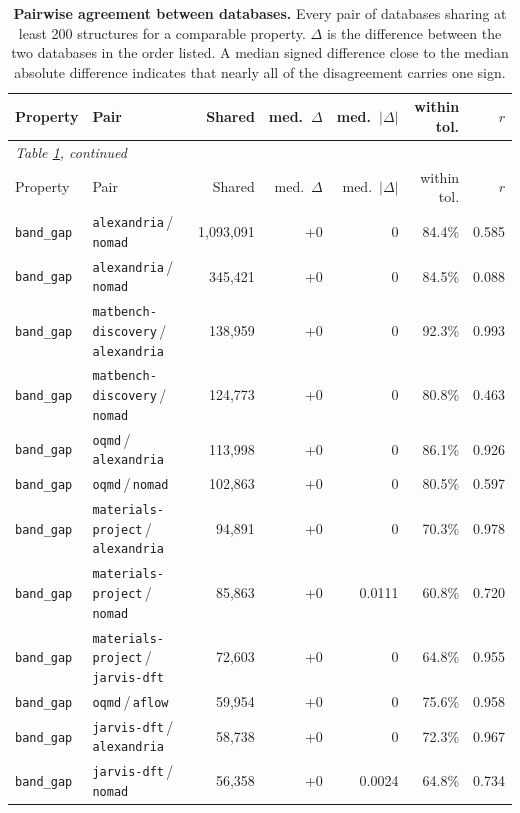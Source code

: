 \begin{longtable}{llrrrrr}
\caption{\textbf{Pairwise agreement between databases.} Every pair of databases sharing at least 200 structures for a comparable property. $\Delta$ is the difference between the two databases in the order listed. A median signed difference close to the median absolute difference indicates that nearly all of the disagreement carries one sign.}\label{tab:pairs}\\
\toprule
Property & Pair & Shared & med.\ $\Delta$ & med.\ $|\Delta|$ & within tol. & $r$ \\ \midrule \endfirsthead
\multicolumn{7}{l}{\footnotesize\itshape Table \ref{tab:pairs}, continued}\\ \toprule
Property & Pair & Shared & med.\ $\Delta$ & med.\ $|\Delta|$ & within tol. & $r$ \\ \midrule \endhead
\bottomrule \endfoot
\texttt{band\_gap} & \texttt{alexandria}\,/\,\texttt{nomad} & 1{,}093{,}091 & +0 & 0 & 84.4\% & 0.585 \\
\texttt{band\_gap} & \texttt{alexandria}\,/\,\texttt{nomad} & 345{,}421 & +0 & 0 & 84.5\% & 0.088 \\
\texttt{band\_gap} & \texttt{matbench-discovery}\,/\,\texttt{alexandria} & 138{,}959 & +0 & 0 & 92.3\% & 0.993 \\
\texttt{band\_gap} & \texttt{matbench-discovery}\,/\,\texttt{nomad} & 124{,}773 & +0 & 0 & 80.8\% & 0.463 \\
\texttt{band\_gap} & \texttt{oqmd}\,/\,\texttt{alexandria} & 113{,}998 & +0 & 0 & 86.1\% & 0.926 \\
\texttt{band\_gap} & \texttt{oqmd}\,/\,\texttt{nomad} & 102{,}863 & +0 & 0 & 80.5\% & 0.597 \\
\texttt{band\_gap} & \texttt{materials-project}\,/\,\texttt{alexandria} & 94{,}891 & +0 & 0 & 70.3\% & 0.978 \\
\texttt{band\_gap} & \texttt{materials-project}\,/\,\texttt{nomad} & 85{,}863 & +0 & 0.0111 & 60.8\% & 0.720 \\
\texttt{band\_gap} & \texttt{materials-project}\,/\,\texttt{jarvis-dft} & 72{,}603 & +0 & 0 & 64.8\% & 0.955 \\
\texttt{band\_gap} & \texttt{oqmd}\,/\,\texttt{aflow} & 59{,}954 & +0 & 0 & 75.6\% & 0.958 \\
\texttt{band\_gap} & \texttt{jarvis-dft}\,/\,\texttt{alexandria} & 58{,}738 & +0 & 0 & 72.3\% & 0.967 \\
\texttt{band\_gap} & \texttt{jarvis-dft}\,/\,\texttt{nomad} & 56{,}358 & +0 & 0.0024 & 64.8\% & 0.734 \\

\end{longtable}
